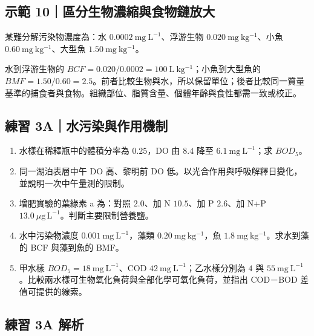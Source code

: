 \documentclass[11pt,a4paper]{article}
\providecommand{\tightlist}{%
  \setlength{\itemsep}{0pt}\setlength{\parskip}{0pt}}
\begin{document}
\begin{HandoutWorkedExample}

\subsection{示範 10｜區分生物濃縮與食物鏈放大}\label{ux793aux7bc4-10ux5340ux5206ux751fux7269ux6fc3ux7e2eux8207ux98dfux7269ux93c8ux653eux5927}

某難分解污染物濃度為：水 \(0.0002\ \mathrm{mg\ L^{-1}}\)、浮游生物 \(0.020\ \mathrm{mg\ kg^{-1}}\)、小魚 \(0.60\ \mathrm{mg\ kg^{-1}}\)、大型魚 \(1.50\ \mathrm{mg\ kg^{-1}}\)。

水到浮游生物的 \(BCF=0.020/0.0002=100\ \mathrm{L\ kg^{-1}}\)；小魚到大型魚的 \(BMF=1.50/0.60=2.5\)。前者比較生物與水，所以保留單位；後者比較同一質量基準的捕食者與食物。組織部位、脂質含量、個體年齡與食性都需一致或校正。

\end{HandoutWorkedExample}

\subsection{練習 3A｜水污染與作用機制}\label{ux7df4ux7fd2-3aux6c34ux6c61ux67d3ux8207ux4f5cux7528ux6a5fux5236}

\begin{enumerate}
\def\labelenumi{\arabic{enumi}.}
\tightlist
\item
  水樣在稀釋瓶中的體積分率為 \(0.25\)，DO 由 \(8.4\) 降至 \(6.1\ \mathrm{mg\ L^{-1}}\)；求 \(BOD_5\)。
\item
  同一湖泊表層中午 DO 高、黎明前 DO 低。以光合作用與呼吸解釋日變化，並說明一次中午量測的限制。
\item
  增肥實驗的葉綠素 a 為：對照 \(2.0\)、加 N \(10.5\)、加 P \(2.6\)、加 N+P \(13.0\ \mu\mathrm{g\,L^{-1}}\)。判斷主要限制營養鹽。
\item
  水中污染物濃度 \(0.001\ \mathrm{mg\ L^{-1}}\)，藻類 \(0.20\ \mathrm{mg\ kg^{-1}}\)，魚 \(1.8\ \mathrm{mg\ kg^{-1}}\)。求水到藻的 BCF 與藻到魚的 BMF。
\item
  甲水樣 \(BOD_5=18\ \mathrm{mg\ L^{-1}}\)、COD \(42\ \mathrm{mg\ L^{-1}}\)；乙水樣分別為 \(4\) 與 \(55\ \mathrm{mg\ L^{-1}}\)。比較兩水樣可生物氧化負荷與全部化學可氧化負荷，並指出 COD－BOD 差值可提供的線索。
\end{enumerate}

\subsection{練習 3A 解析}\label{ux7df4ux7fd2-3a-ux89e3ux6790}
\end{document}
